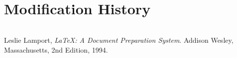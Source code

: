\documentclass{template/openetcs_article}
\begin{document}



\begin{abstract}
  \lipsum[12-13]
\end{abstract}

\maketitle

\section*{Modification History}
\begin{supertabular}{| m{1.2cm} | m{1.2cm} | m{6.6cm} | m{4cm} |}
 & & & \\\hline
\end{supertabular}


\tableofcontents
\listoffiguresandtables
\newpage










\begin{thebibliography}{9}

  Leslie Lamport,
  \emph{\LaTeX: A Document Preparation System}.
  Addison Wesley, Massachusetts,
  2nd Edition,
  1994.

\end{thebibliography}

\end{document}
